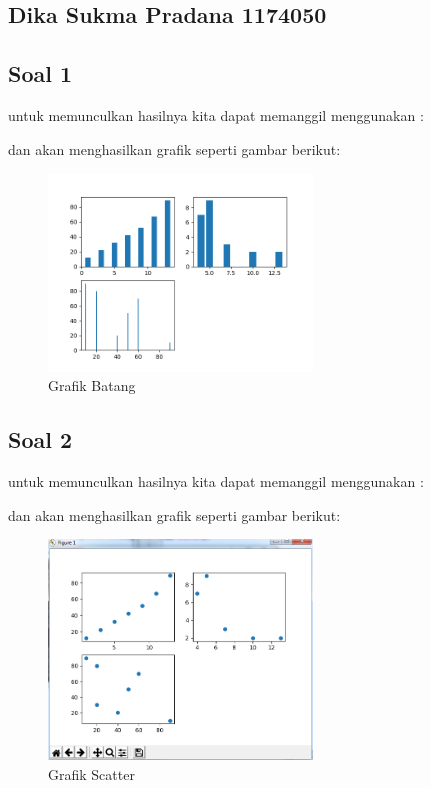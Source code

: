 	
	\subsection{Dika Sukma Pradana 1174050}
\subsection{Soal 1}


untuk memunculkan hasilnya kita dapat memanggil menggunakan :


dan akan menghasilkan grafik seperti gambar berikut:
\begin{figure}[H]
\centering
\includegraphics[width=7cm]{figures/6/1174050/Praktek/pbar.png}
\caption{Grafik Batang}
\end{figure}

\subsection{Soal 2}


untuk memunculkan hasilnya kita dapat memanggil menggunakan :


dan akan menghasilkan grafik seperti gambar berikut:
\begin{figure}[H]
\centering
\includegraphics[width=7cm]{figures/6/1174050/Praktek/pscatter.png}
\caption{Grafik Scatter}
\end{figure}

